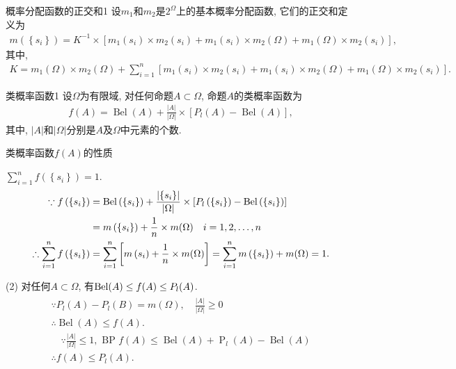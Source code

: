 \begin{mydef}{概率分配函数的正交和}{1}
设$m_1$和$m_2$是$2^\Omega$上的基本概率分配函数, 它们的正交和定义为
\begin{align}
 m\left(\left\{s_{i}\right\}\right)=K^{-1} \times\left[m_{1}\left(s_{i}\right) \times m_{2}\left(s_{i}\right)+m_{1}\left(s_{i}\right) \times m_{2}(\Omega)+m_{1}(\Omega) \times m_{2}\left(s_{i}\right)\right],
\end{align}
其中,
\begin{align}
  K=m_{1}(\Omega) \times m_{2}(\Omega)+\sum_{i=1}^{n}\left[m_{1}\left(s_{i}\right) \times m_{2}\left(s_{i}\right)+m_{1}\left(s_{i}\right) \times m_{2}(\Omega)+m_{1}(\Omega) \times m_{2}\left(s_{i}\right)\right].
\end{align}
\end{mydef}
\begin{mydef}{类概率函数}{1}
设$\Omega$为有限域, 对任何命题$A\subset \Omega$, 命题$A$的类概率函数为
\begin{align}
  f(A)=\operatorname{Bel}(A)+\frac{|A|}{|\Omega|} \times[P_l(A)-\operatorname{Bel}(A)],
\end{align}
其中, $|A|$和$|\Omega|$分别是$A$及$\Omega$中元素的个数.
\end{mydef}

类概率函数$f(A)$的性质

 $\sum_{i=1}^{n} f\left(\left\{s_{i}\right\}\right)=1$.
\begin{align}
\because f\left(\left\{s_{i}\right\}\right) &=\operatorname{Bel}\left(\left\{s_{i}\right\}\right)+\frac{\left|\left\{s_{i}\right\}\right|}{|\Omega|} \times\left[P_l\left(\left\{s_{i}\right\}\right)-\operatorname{Bel}\left(\left\{s_{i}\right\}\right)\right] \notag\\
  &=m\left(\left\{s_{i}\right\}\right)+\frac{1}{n} \times m(\Omega) \quad i=1,2, \ldots, n \\
\therefore \sum_{i=1}^{n} f\left(\left\{s_{i}\right\}\right)
    &=\sum_{i=1}^{n}\left[m\left(s_{i}\right)+\frac{1}{n} \times m(\Omega)\right]
   =\sum_{i=1}^{n} m\left(\left\{s_{i}\right\}\right)+m(\Omega)=1.
\end{align}

(2) 对任何$A\subset\Omega$, 有$\textup{Bel}(A)\leq f(A)\leq P_l(A)$.
\begin{align}
\begin{array}{l}
{\because P_l(A)-P_l(B)=m(\Omega), \quad \frac{|A|}{|\Omega|} \geq 0} \\
{\therefore \operatorname{Bel}(A) \leq f(A)}. \\
 {\quad \because \frac{|A|}{|\Omega|} \leq 1, \text { BP } f(A) \leq \operatorname{Bel}(A)+\operatorname{P}_l(A)-\operatorname{Bel}(A)} \\
  \therefore f(A) \leq P_l(A).
  \end{array}
\end{align}


